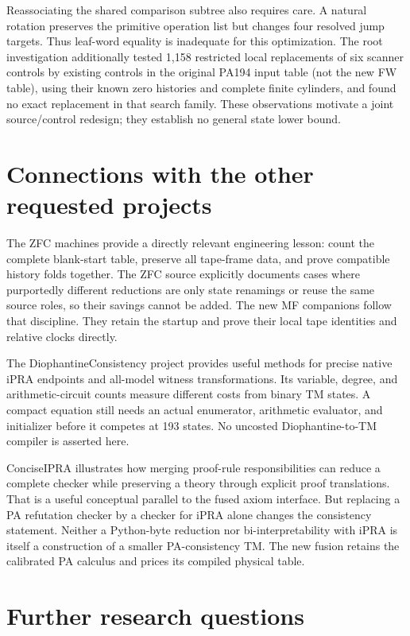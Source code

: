 \documentclass[11pt,a4paper]{article}
\theoremstyle{definition}\newtheorem{definition}[theorem]{Definition}
\theoremstyle{remark}\newtheorem{remark}[theorem]{Remark}
\begin{document}
Reassociating the shared comparison subtree also requires care. A natural
rotation preserves the primitive operation list but changes four resolved
jump targets. Thus leaf-word equality is inadequate for this optimization.
The root investigation additionally tested 1,158 restricted local
replacements of six scanner controls by existing controls in the original
PA194 input table (not the new FW table), using their
known zero histories and complete finite cylinders, and found no exact
replacement in that search family. These observations motivate a joint
source/control redesign; they establish no general state lower bound.

\section{Connections with the other requested projects}

The ZFC machines provide a directly relevant engineering lesson: count
the complete blank-start table, preserve all tape-frame data, and prove
compatible history folds together. The ZFC source explicitly documents
cases where purportedly different reductions are only state renamings or
reuse the same source roles, so their savings cannot be added\cite{zfc}. The new MF
companions follow that discipline. They retain the startup and prove
their local tape identities and relative clocks directly.

The DiophantineConsistency project provides useful methods for precise
native iPRA endpoints and all-model witness transformations\cite{dio}. Its variable,
degree, and arithmetic-circuit counts measure different costs from binary
TM states. A compact equation still needs an actual enumerator, arithmetic
evaluator, and initializer before it competes at 193 states. No uncosted
Diophantine-to-TM compiler is asserted here.

ConciseIPRA illustrates how merging proof-rule responsibilities can reduce
a complete checker while preserving a theory through explicit proof
translations\cite{concise}. That is a useful conceptual parallel to the fused axiom
interface. But replacing a PA refutation checker by a checker for iPRA
alone changes the consistency statement. Neither a Python-byte reduction
nor bi-interpretability with iPRA is itself a construction of a smaller
PA-consistency TM. The new fusion retains the calibrated PA calculus and
prices its compiled physical table.

\section{Further research questions}
\end{document}
